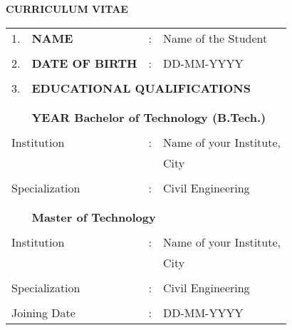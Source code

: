 
\begin{center}
{\bf  CURRICULUM VITAE }

\end{center}
\begin{table}[htbp]
		\begin{tabular}[r]{rlrl} 
			1. & {\bf NAME} & : & Name of the Student\\
			&&&\\
			2. & {\bf DATE OF BIRTH} & : & DD-MM-YYYY\\
			&&&\\
			3. & \multicolumn{3}{l}{{\bf EDUCATIONAL QUALIFICATIONS}}  \\
			&&&\\
			&&&\\
			& \multicolumn{3}{l}{{\bf YEAR Bachelor of Technology (B.Tech.)}} 		\\	
			&&&\\
			\multicolumn{2}{l}{\hspace{3cm} Institution} & : & Name of your Institute,\\
			&&&City\\
						&&&\\
			\multicolumn{2}{l}{\hspace{3cm} Specialization} & : &Civil Engineering\\
			&&&\\
			&&&\\
			& \multicolumn{3}{l}{{\bf Master of Technology}}		\\	
			&&&\\
			\multicolumn{2}{l}{\hspace{3cm} Institution} & : & Name of your Institute,\\
			&&&City\\
						&&&\\
			\multicolumn{2}{l}{\hspace{3cm} Specialization} & : &Civil Engineering\\
						&&&\\
			\multicolumn{2}{l}{\hspace{3cm} Joining Date} & : &DD-MM-YYYY\\			
		\end{tabular}
		\label{tab:curriculum}
\end{table}
